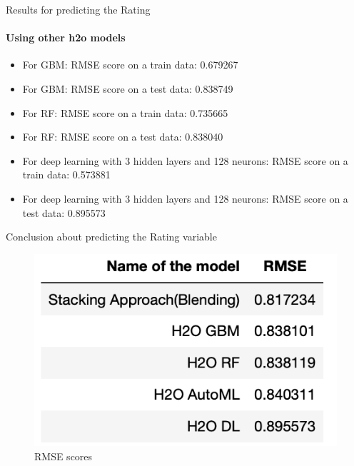 \documentclass[11pt]{beamer}
\begin{document}
\begin{frame}{Results for predicting the Rating}
	\framesubtitle{ Using other h2o models}
	\begin{itemize}
		\item For GBM:
		RMSE score on a train data: 0.679267
		\pause 
			\item For GBM:
		RMSE score on a test data: 0.838749
		\pause 
		\item For RF:
		RMSE score on a train data: 0.735665
		\pause 
		\item For RF:
		RMSE score on a test data: 0.838040
		\pause 
		\item For deep learning with 3 hidden layers and 128 neurons:
		RMSE score on a train data: 0.573881
		\pause 
		\item For deep learning with 3 hidden layers and 128 neurons:
		RMSE score on a test data: 0.895573
	\end{itemize}
\end{frame}

\begin{frame}{Conclusion about predicting the Rating variable}
	\begin{figure}
		\centering
		\includegraphics[scale =0.50]{TableRatingConclusion}
		\caption{RMSE scores}
	\end{figure}		
\end{frame}
\end{document}
